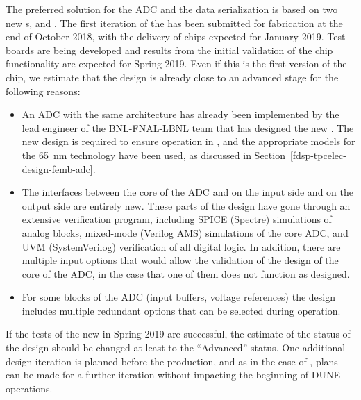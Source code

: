 The preferred solution for the ADC and the data serialization is based on two new 
s,  and .
The first iteration of the  has been submitted for fabrication
at the end of October 2018, with the delivery of chips expected for January 2019.
Test boards are being developed and results from the initial validation of the
chip functionality are expected for Spring 2019. Even if this is the first version
of the chip, we estimate that the design is already close to an advanced stage
for the following reasons:
\begin{itemize}
\item{An ADC with the same architecture has already been implemented by the
lead engineer of the BNL-FNAL-LBNL team that has designed the new .
The new design is required to ensure operation in \lar, and the appropriate
models for the \SI{65}{nm} technology have been used, as discussed in
Section~\ref{fdsp-tpcelec-design-femb-adc}.}
\item{The interfaces between the core of the ADC and  on 
the input side and  on the output side are entirely new.
These parts of the design have gone through an extensive verification
program, including SPICE (Spectre) simulations of analog blocks,
mixed-mode (Verilog AMS) simulations of the core ADC, and
UVM (SystemVerilog) verification of all digital logic. In addition, there are multiple 
input options that would allow the validation of the design of the core 
of the ADC, in the case that one of them does not function as designed.}
\item{For some blocks of the ADC (input buffers, voltage references) the
design includes multiple redundant options that can be selected during 
operation.}
\end{itemize}
If the tests of the new  in Spring 2019 are successful, the
estimate of the status of the design should be changed at least to the 
``Advanced'' status. One additional design iteration is planned before
the production, and as in the case of , plans can be made for a
further iteration without impacting the beginning of DUNE operations.

